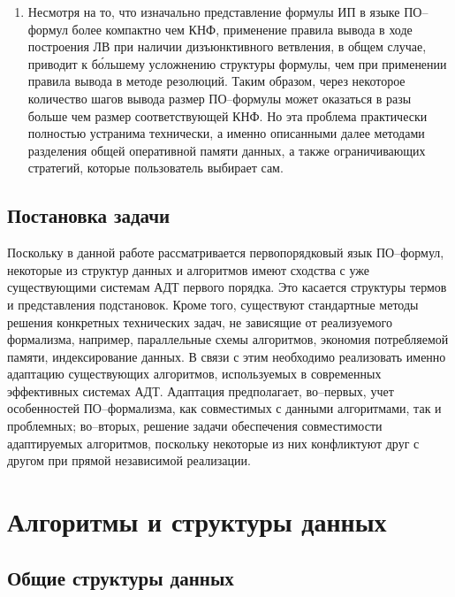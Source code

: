 \begin{enumerate}
\item Несмотря на то, что изначально представление формулы ИП в языке ПО--формул более компактно чем КНФ, применение правила вывода в ходе построения ЛВ при наличии дизъюнктивного ветвления, в общем случае, приводит к б\'{о}льшему усложнению структуры формулы, чем при применении правила вывода в методе резолюций. Таким образом, через некоторое количество шагов вывода размер ПО--формулы может оказаться в разы больше чем размер соответствующей КНФ. Но эта проблема практически полностью устранима технически, а именно описанными далее методами разделения общей оперативной памяти данных, а также ограничивающих стратегий, которые пользователь выбирает сам.
\end{enumerate}

\subsection{Постановка задачи}
Поскольку в данной работе рассматривается первопорядковый язык ПО--формул, некоторые из структур данных и алгоритмов имеют сходства с уже существующими системам АДТ первого порядка. Это касается структуры термов и представления подстановок. Кроме того, существуют стандартные методы решения конкретных технических задач, не зависящие от реализуемого формализма, например, параллельные схемы алгоритмов, экономия потребляемой памяти, индексирование данных. В связи с этим необходимо реализовать именно адаптацию существующих алгоритмов, используемых в современных эффективных системах АДТ. Адаптация предполагает, во--первых, учет особенностей ПО--формализма, как совместимых с данными алгоритмами, так и проблемных; во--вторых, решение задачи обеспечения совместимости адаптируемых алгоритмов, поскольку некоторые из них конфликтуют друг с другом при прямой независимой реализации.

\section{Алгоритмы и структуры данных}

\subsection{Общие структуры данных}


